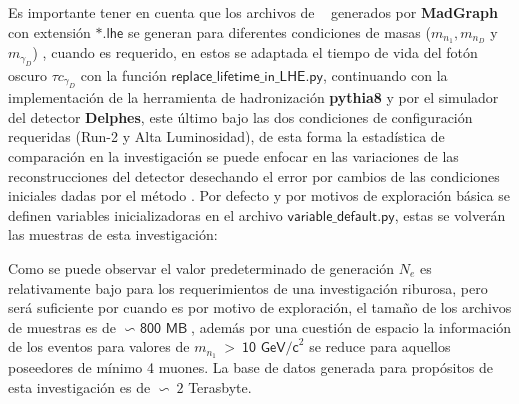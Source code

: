 Es importante tener en cuenta que los archivos de \MC ~ generados por \textbf{MadGraph} con extensión $\textsf{*.lhe}$ se generan para diferentes condiciones de masas ($m_{n_1}, m_{n_D}$ y  $m_{\gamma_D}$)%
, cuando  es requerido, en estos se adaptada el tiempo de vida del fotón oscuro $\tau c_{\gamma_D}$ %
con la función $\textsf{replace\_lifetime\_in\_LHE.py}$, continuando con la implementación de la herramienta de hadronización \textbf{pythia8} y por el simulador del detector \textbf{Delphes}, este último bajo las dos condiciones de configuración requeridas (Run-2 y Alta Luminosidad), de esta forma la estadística de comparación en la investigación se puede enfocar en las variaciones de las reconstrucciones del detector desechando el error por cambios de las condiciones iniciales dadas por el método \MC. 
Por defecto y por motivos de exploración básica se definen variables inicializadoras en el archivo $\textsf{variable\_default.py}$, estas se volverán las muestras de esta investigación:

Como se puede observar el valor predeterminado de generación $N_e$ es relativamente bajo para los requerimientos de una investigación riburosa, pero será suficiente por cuando es por motivo de exploración, el tamaño de los archivos de muestras es de $\backsim\textsf{ 800 MB}$, además por una cuestión de espacio la información de los eventos para valores de $m_{n_1}~>~\textsf{10 GeV/c}^2$ %
se reduce para aquellos poseedores de mínimo 4 muones. La base de datos generada para propósitos de esta investigación es de $\backsim ~2$ Terasbyte.






















